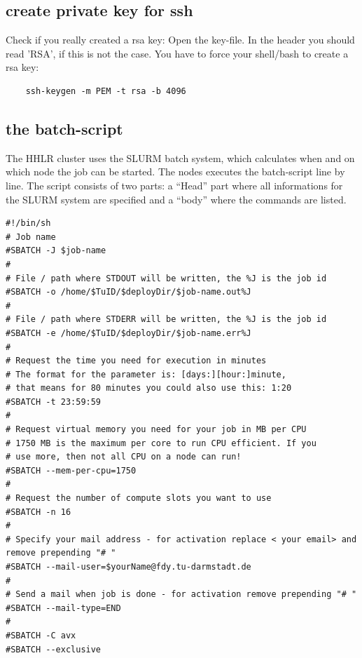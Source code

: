 \documentclass[11pt,twoside,a4paper]{fdyartcl}
\begin{document}
\begin{lstlisting}[caption={Submission over Startup string}, label={lst:bps_ws}]
\end{lstlisting}
\setcounter{BoSSSblkCounter}{-1}
\setcounter{BoSSSinblkCounter}{-1}
\renewcommand{\BoSSSbwsName}{UsingSlurmClientStartupString}





\subsection{create private key for ssh}
\label{sec:sshkey}
Check if you really created a rsa key: Open the key-file. In the header you should read 'RSA', if this is not the case. You have to force your shell/bash to create a rsa key:
\begin{verbatim}
	ssh-keygen -m PEM -t rsa -b 4096
\end{verbatim}


\subsection{the batch-script}
\label{sec:sbatch}

The HHLR cluster uses the SLURM batch system, which calculates when and on which node the job can be started. The nodes executes the batch-script line by line. The script consists of two parts: a ``Head'' part where all informations for the SLURM system are specified and a ``body'' where the commands are listed.\\

\noindent
\begin{minipage}{\linewidth}
\begin{lstlisting}[caption={Batch-script: head}, 
label={lst:head_batch}]
#!/bin/sh
# Job name
#SBATCH -J $job-name
#
# File / path where STDOUT will be written, the %J is the job id
#SBATCH -o /home/$TuID/$deployDir/$job-name.out%J
#
# File / path where STDERR will be written, the %J is the job id
#SBATCH -e /home/$TuID/$deployDir/$job-name.err%J
#
# Request the time you need for execution in minutes
# The format for the parameter is: [days:][hour:]minute,
# that means for 80 minutes you could also use this: 1:20
#SBATCH -t 23:59:59
#
# Request virtual memory you need for your job in MB per CPU
# 1750 MB is the maximum per core to run CPU efficient. If you
# use more, then not all CPU on a node can run!
#SBATCH --mem-per-cpu=1750
#
# Request the number of compute slots you want to use
#SBATCH -n 16
#
# Specify your mail address - for activation replace < your email> and remove prepending "# "
#SBATCH --mail-user=$yourName@fdy.tu-darmstadt.de
#
# Send a mail when job is done - for activation remove prepending "# "
#SBATCH --mail-type=END
#
#SBATCH -C avx
#SBATCH --exclusive
\end{lstlisting}

\end{minipage}
\end{document}
